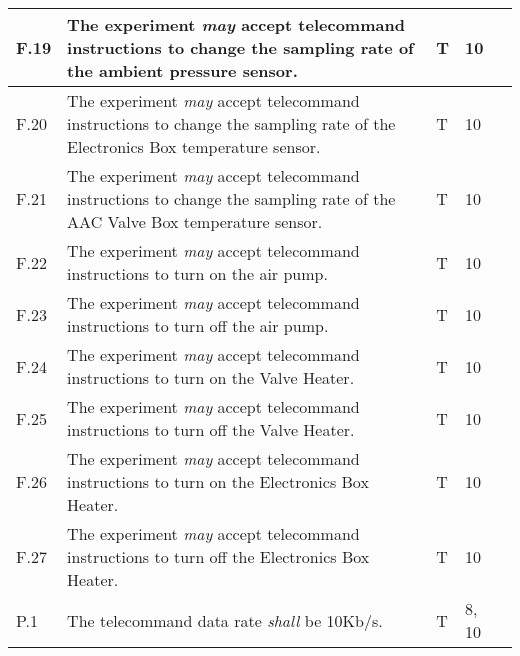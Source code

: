 \begin{longtable}[]{|m{}| m{} |m{} |m{}|m{}|}
F.19 & The experiment \textit{may} accept telecommand instructions to change the sampling rate of the ambient pressure sensor.                                                          &     T         & 10            &        \\ \hline
F.20 & The experiment \textit{may} accept telecommand instructions to change the sampling rate of the Electronics Box temperature sensor.                                                       &      T        & 10            &        \\ \hline
F.21 & The experiment \textit{may} accept telecommand instructions to change the sampling rate of the AAC Valve Box temperature sensor.                                                 &      T        & 10            &        \\ \hline
F.22 & The experiment \textit{may} accept telecommand instructions to turn on the air pump.                                                                                             &      T        & 10            &        \\ \hline
F.23 & The experiment \textit{may} accept telecommand instructions to turn off the air pump.                                                                                            &       T       & 10            &        \\ \hline
F.24 & The experiment \textit{may} accept telecommand instructions to turn on the Valve Heater.                                                                                         &      T        & 10            &        \\ \hline
F.25 & The experiment \textit{may} accept telecommand instructions to turn off the Valve Heater.                                                                                        &      T        & 10            &        \\ \hline
F.26 & The experiment \textit{may} accept telecommand instructions to turn on the Electronics Box Heater.                                                                                    &      T        & 10            &        \\ \hline
F.27 & The experiment \textit{may} accept telecommand instructions to turn off the Electronics Box Heater.                                                                                   &      T        & 10            &        \\ \hline
P.1  & The telecommand data rate \textit{shall} be 10Kb/s.                                                                                                                          &        T      & 8, 10            &        \\ \hline

\end{longtable}
